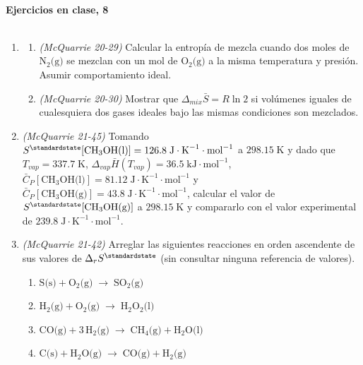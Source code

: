 \documentclass[a4paper,12pt]{article}
\begin{document}

\begin{center}
\HRule \\[0.4cm]
{ \bfseries Ejercicios en clase, 8}\\ %
\HRule \\[0.4cm]
\end{center}


\begin{enumerate}

 \item 
 \begin{enumerate}
  \item \textit{(McQuarrie 20-29)} Calcular la entrop\'ia de mezcla cuando dos moles de $\mbox{N}_2\mbox{(g)}$ se mezclan con un mol de $\mbox{O}_2\mbox{(g)}$ a la misma temperatura y presi\'on. Asumir comportamiento ideal. %

  \item \textit{(McQuarrie 20-30)} Mostrar que $\Delta_{mix}\bar{S}=R\ln 2$ si vol\'umenes iguales de cualesquiera dos gases ideales bajo las mismas condiciones son mezclados. %
 \end{enumerate}

 \item \textit{(McQuarrie 21-45)} Tomando $S^\standardstate[\mbox{CH}_3\mbox{OH(l)}]=126.8\;\mbox{J}\cdot\mbox{K}^{-1}\cdot\mbox{mol}^{-1}$ a $298.15\;\mbox{K}$ y dado que $T_{vap}=337.7\;\mbox{K}$, $\Delta_{vap}\bar{H}(T_{vap})=36.5\;\mbox{kJ}\cdot\mbox{mol}^{-1}$, $\bar{C}_P[\mbox{CH}_3\mbox{OH(l)}]=81.12\;\mbox{J}\cdot\mbox{K}^{-1}\cdot\mbox{mol}^{-1}$ y $\bar{C}_P[\mbox{CH}_3\mbox{OH(g)}]=43.8\;\mbox{J}\cdot\mbox{K}^{-1}\cdot\mbox{mol}^{-1}$, calcular el valor de $S^\standardstate[\mbox{CH}_3\mbox{OH(g)}]$ a $298.15\;\mbox{K}$ y compararlo con el valor experimental de $239.8\;\mbox{J}\cdot\mbox{K}^{-1}\cdot\mbox{mol}^{-1}$. %

 \item \textit{(McQuarrie 21-42)} Arreglar las siguientes reacciones en orden ascendente de sus valores de $\Delta_rS^\standardstate$ (sin consultar ninguna referencia de valores).
 \begin{enumerate}
  \item $\mbox{S(s)}+\mbox{O}_2\mbox{(g)}\;\rightarrow\;\mbox{SO}_2\mbox{(g)}$
  \item $\mbox{H}_2\mbox{(g)}+\mbox{O}_2\mbox{(g)}\;\rightarrow\;\mbox{H}_2\mbox{O}_2\mbox{(l)}$
  \item $\mbox{CO(g)}+3\,\mbox{H}_2\mbox{(g)}\;\rightarrow\;\mbox{CH}_4\mbox{(g)}+\mbox{H}_2\mbox{O(l)}$
  \item $\mbox{C(s)}+\mbox{H}_2\mbox{O(g)}\;\rightarrow\;\mbox{CO(g)}+\mbox{H}_2\mbox{(g)}$
 \end{enumerate} %


\end{enumerate}
\end{document}
